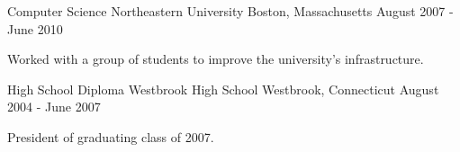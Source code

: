 %
%
%
%



\begin{cventries}

  \cventry
    {Computer Science} %
    {Northeastern University} %
    {Boston, Massachusetts} %
    {August 2007 - June 2010} %
    {
      \begin{cvitems} %
        \item {Worked with a group of students to improve the university's infrastructure.}
      \end{cvitems}
    }

  \cventry
    {High School Diploma} %
    {Westbrook High School} %
    {Westbrook, Connecticut} %
    {August 2004 - June 2007} %
    {
      \begin{cvitems} %
        \item {President of graduating class of 2007.}
      \end{cvitems}
    }
\end{cventries}
